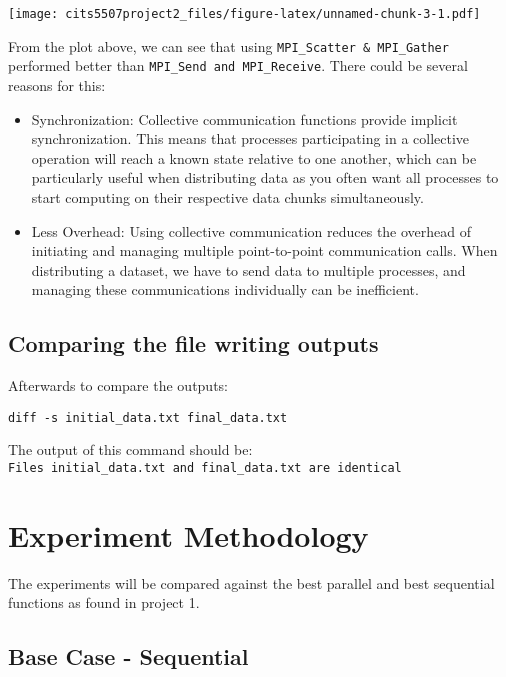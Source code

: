 \documentclass[
]{article}
\begin{document}
\texttt{[image: cits5507project2\_files/figure-latex/unnamed-chunk-3-1.pdf]}

From the plot above, we can see that using
\texttt{MPI\_Scatter\ \&\ MPI\_Gather} performed better than
\texttt{MPI\_Send\ and\ MPI\_Receive}. There could be several reasons
for this:

\begin{itemize}
\item
  Synchronization: Collective communication functions provide implicit
  synchronization. This means that processes participating in a
  collective operation will reach a known state relative to one another,
  which can be particularly useful when distributing data as you often
  want all processes to start computing on their respective data chunks
  simultaneously.
\item
  Less Overhead: Using collective communication reduces the overhead of
  initiating and managing multiple point-to-point communication calls.
  When distributing a dataset, we have to send data to multiple
  processes, and managing these communications individually can be
  inefficient.
\end{itemize}

\hypertarget{comparing-the-file-writing-outputs}{%
\subsection{Comparing the file writing
outputs}\label{comparing-the-file-writing-outputs}}

Afterwards to compare the outputs:

\begin{verbatim}
diff -s initial_data.txt final_data.txt
\end{verbatim}

The output of this command should be:
\texttt{Files\ initial\_data.txt\ and\ final\_data.txt\ are\ identical}

\hypertarget{experiment-methodology}{%
\section{Experiment Methodology}\label{experiment-methodology}}

The experiments will be compared against the best parallel and best
sequential functions as found in project 1.

\hypertarget{base-case---sequential}{%
\subsection{Base Case - Sequential}\label{base-case---sequential}}
\end{document}
